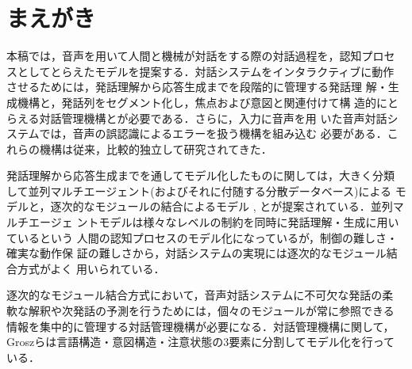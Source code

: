 

\maketitle


\section{まえがき}

本稿では，音声を用いて人間と機械が対話をする際の対話過程を，認知プロセ
スとしてとらえたモデルを提案する．対話システムをインタラクティブに動作
させるためには，発話理解から応答生成までを段階的に管理する{\dg 発話理
解・生成機構}と，発話列をセグメント化し，焦点および意図と関連付けて構
造的にとらえる{\dg 対話管理機構}とが必要である．さらに，入力に音声を用
いた音声対話システムでは，音声の誤認識によるエラーを扱う機構を組み込む
必要がある．これらの機構は従来，比較的独立して研究されてきた．

発話理解から応答生成までを通してモデル化したものに関しては，大きく分類
して並列マルチエージェント(およびそれに付随する分散データベース)による
モデル\cite{peckham91}と，逐次的なモジュールの結合によるモデル
\cite{jonsson91}, \cite{airenti93}とが提案されている．並列マルチエージェ
ントモデルは様々なレベルの制約を同時に発話理解・生成に用いているという
人間の認知プロセスのモデル化になっているが，制御の難しさ・確実な動作保
証の難しさから，対話システムの実現には逐次的なモジュール結合方式がよく
用いられている．

逐次的なモジュール結合方式において，音声対話システムに不可欠な発話の柔
軟な解釈や次発話の予測を行うためには，個々のモジュールが常に参照できる
情報を集中的に管理する対話管理機構が必要になる．対話管理機構に関して，
Groszらは言語構造・意図構造・注意状態の3要素に分割してモデル化を行って
いる\cite{grosz86}．

